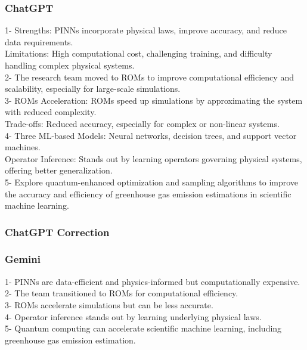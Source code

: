 \subsubsection{ChatGPT}
\begin{tcolorbox}[breakable]
    1- Strengths: PINNs incorporate physical laws, improve accuracy, and reduce data requirements.\\
   Limitations: High computational cost, challenging training, and difficulty handling complex physical systems.\\
2- The research team moved to ROMs to improve computational efficiency and scalability, especially for large-scale simulations.\\
3- ROMs Acceleration: ROMs speed up simulations by approximating the system with reduced complexity.\\
   Trade-offs: Reduced accuracy, especially for complex or non-linear systems.\\
4- Three ML-based Models: Neural networks, decision trees, and support vector machines.\\
   Operator Inference: Stands out by learning operators governing physical systems, offering better generalization.\\
5- Explore quantum-enhanced optimization and sampling algorithms to improve the accuracy and efficiency of greenhouse gas emission estimations in scientific machine learning.\\
\end{tcolorbox}
\subsubsection{ChatGPT Correction}
\begin{tcolorbox}[breakable]
    
\end{tcolorbox}
\subsubsection{Gemini}
\begin{tcolorbox}[breakable]
1- PINNs are data-efficient and physics-informed but computationally expensive.\\
2- The team transitioned to ROMs for computational efficiency.\\
3- ROMs accelerate simulations but can be less accurate.\\
4- Operator inference stands out by learning underlying physical laws.\\
5- Quantum computing can accelerate scientific machine learning, including greenhouse gas emission estimation.\\
\end{tcolorbox}

